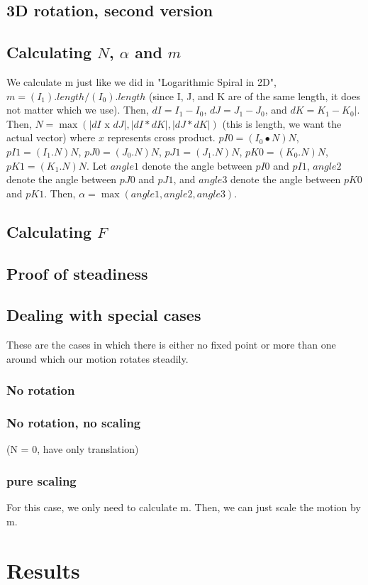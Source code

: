 \documentclass[journal, letterpaper]{IEEEtran}
\begin{document}
\subsection{3D rotation, second version}


\subsection{Calculating $N$, $\alpha$ and $m$}
We calculate m just like we did in "Logarithmic Spiral in 2D", $m = (I_1).length / (I_0).length$ (since I, J, and K are of the same length, it does not matter which we use).  Then, $dI = I_1 - I_0$, $dJ = J_1 - J_0$, and $dK = K_1 - K_0|$.  Then, $N = \max{(|dI\text{ x }dJ|, |dI*dK|, |dJ*dK|)}$ (this is length, we want the actual vector) where $x$ represents cross product.  
$pI0 = (I_0\bullet N)N$, $pI1 = (I_1.N)N$, $pJ0 = (J_0.N)N$, $pJ1 = (J_1.N)N$, $pK0 = (K_0.N)N$, $pK1 = (K_1.N)N$.  Let $angle1$ denote the angle between $pI0$ and $pI1$, $angle2$ denote the angle between $pJ0$ and $pJ1$, and $angle3$ denote the angle between $pK0$ and $pK1$.  Then, $\alpha = \max{(angle1, angle2, angle3)}$. 

\subsection{Calculating $F$}

\subsection{Proof of steadiness}

\subsection{Dealing with special cases}
These are the cases in which there is either no fixed point or more than one around which our motion rotates steadily.

\subsubsection{No rotation}

\subsubsection{No rotation, no scaling}
(N = 0, have only translation)

\subsubsection{pure scaling}
For this case, we only need to calculate m.  Then, we can just scale the motion by m.

\section{Results}
\end{document}
